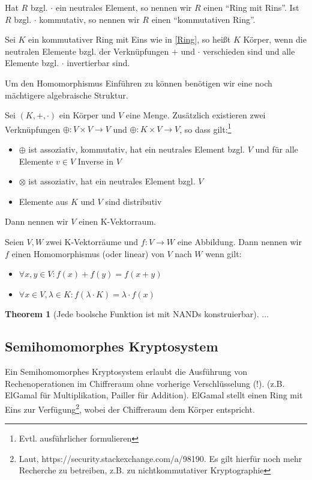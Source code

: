 \documentclass[12pt,a4paper]{scrartcl}	%
\begin{document}
Hat $R$ bzgl. $\cdot$ ein neutrales Element, so nennen wir $R$ einen \enquote{Ring mit Rins}. Ist $R$ bzgl. $\cdot$ kommutativ, so nennen wir $R$ einen \enquote{kommutativen Ring}. 

\begin{theorem}[Körper]
Sei $K$ ein kommutativer Ring mit Eins wie in \ref{Ring}, so heißt $K$ Körper, wenn die neutralen Elemente bzgl. der Verknüpfungen $+$ und $\cdot$ verschieden sind und alle Elemente bzgl. $\cdot$ invertierbar sind.
	
\end{theorem}

Um den Homomorphismus Einführen zu können benötigen wir eine noch mächtigere algebraische Struktur.

\begin{theorem}[K-Vektorraum]
Sei $(K,+,\cdot)$ ein Körper und $V$ eine Menge. Zusätzlich existieren zwei Verknüpfungen $\oplus: V\times V \rightarrow V$ und $\oplus: K\times V \rightarrow V$, so dass gilt:\footnote{Evtl. ausführlicher formulieren}
\begin{itemize}
	\item $\oplus$ ist assoziativ, kommutativ, hat ein neutrales Element bzgl. $V$ und für alle Elemente $v\in V$ Inverse in $V$
	\item $\otimes$ ist assoziativ, hat ein neutrales Element bzgl. $V$
	\item Elemente aus $K$ und $V$ sind distributiv
\end{itemize}
Dann nennen wir $V$ einen K-Vektorraum.
\end{theorem}

\begin{theorem}[Homomorphismus]
Seien $V,W$ zwei K-Vektorräume und $f:V\rightarrow W$ eine Abbildung. Dann nennen wir $f$ einen Homomorphismus (oder linear) von $V$ nach $W$ wenn gilt:
\begin{itemize}
	\item $\forall x,y\in V : f(x)+f(y) = f(x+y)$
	\item $\forall x\in V, \lambda\in K: f(\lambda\cdot K)=\lambda\cdot f(x)$
\end{itemize}
\end{theorem}

\newtheorem{theorem2}{Theorem}[section]
\begin{theorem2}[Jede boolsche Funktion ist mit NANDs konstruierbar]
	$\ldots$
\end{theorem2}

\subsection{Semihomomorphes Kryptosystem}
Ein Semihomomorphes Kryptosystem erlaubt die Ausführung von Rechenoperationen im Chiffreraum ohne vorherige Verschlüsselung (!). (z.B. ElGamal für Multiplikation, Pailler für Addition). ElGamal stellt einen Ring mit Eins zur Verfügung\footnote{Laut, https://security.stackexchange.com/a/98190. Es gilt hierfür noch mehr Recherche zu betreiben, z.B. zu nichtkommutativer Kryptographie}, wobei der Chiffreraum dem Körper entspricht. 
\end{document}
